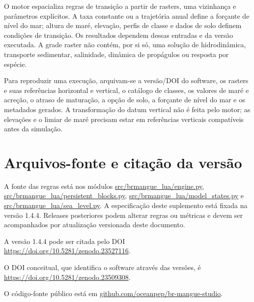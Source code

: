 \documentclass[11pt,a4paper]{article}
\begin{document}
O motor espacializa regras de transição a partir de rasters, uma vizinhança e parâmetros explícitos. A taxa constante ou a trajetória anual define a forçante de nível do mar; altura de maré, elevação, perfis de classe e dados de solo definem condições de transição. Os resultados dependem dessas entradas e da versão executada. A grade raster não contém, por si só, uma solução de hidrodinâmica, transporte sedimentar, salinidade, dinâmica de propágulos ou resposta por espécie.

Para reproduzir uma execução, arquivam-se a versão/DOI do software, os rasters e suas referências horizontal e vertical, o catálogo de classes, os valores de maré e acreção, o atraso de maturação, a opção de solo, a forçante de nível do mar e os metadados gerados. A transformação do datum vertical não é feita pelo motor; as elevações e o limiar de maré precisam estar em referências verticais compatíveis antes da simulação.

\section{Arquivos-fonte e citação da versão}

A fonte das regras está nos módulos \url{src/brmangue_lua/engine.py}, \url{src/brmangue_lua/persistent_blocks.py}, \url{src/brmangue_lua/model_states.py} e \url{src/brmangue_lua/sea_level.py}. A especificação deste suplemento está fixada na versão 1.4.4. Releases posteriores podem alterar regras ou métricas e devem ser acompanhados por atualização versionada deste documento.

A versão 1.4.4 pode ser citada pelo DOI \url{https://doi.org/10.5281/zenodo.23527116}.

O DOI conceitual, que identifica o software através das versões, é \url{https://doi.org/10.5281/zenodo.23509308}.

O código-fonte público está em \href{https://github.com/oceanpep/br-mangue-studio}{github.com/oceanpep/br-mangue-studio}.
\end{document}

